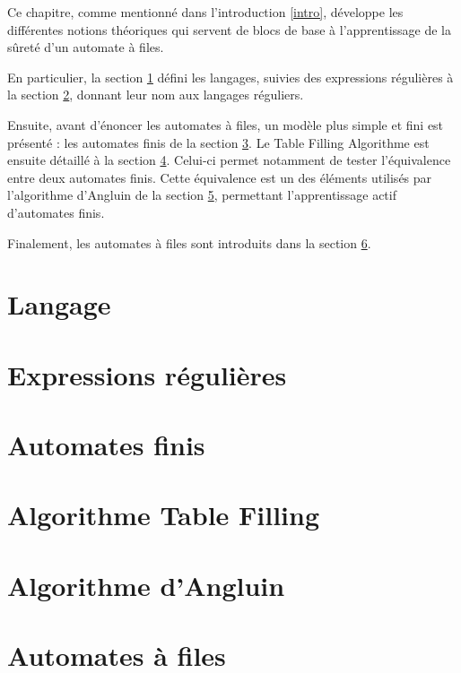 Ce chapitre, comme mentionné dans l'introduction \ref{intro}, développe les différentes notions théoriques qui servent de blocs de base à l'apprentissage de la sûreté d'un automate à files.

En particulier, la section \ref{lang} défini les langages, suivies des expressions régulières à la section \ref{regex}, donnant leur nom aux langages réguliers.

Ensuite, avant d'énoncer les automates à files, un modèle plus simple et fini est présenté : les automates finis de la section \ref{adf}. Le Table Filling Algorithme est ensuite détaillé à la section \ref{tfa}. Celui-ci permet notamment de tester l'équivalence entre deux automates finis. Cette équivalence est un des éléments utilisés par l'algorithme d'Angluin de la section \ref{angluin}, permettant l'apprentissage actif d'automates finis.

Finalement, les automates à files sont introduits dans la section \ref{fifo}.

\section{Langage}\label{lang}
\section{Expressions régulières}\label{regex}
\section{Automates finis}\label{adf}
\section{Algorithme Table Filling}\label{tfa}
\section{Algorithme d'Angluin}\label{angluin}
\section{Automates à files}\label{fifo}
